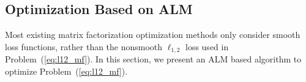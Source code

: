 \documentclass[letterpaper]{article}
\def\bE{{\bf E}}
\def\blambda{{\bm \lambda}}
\def\calC{{\mathcal{C}}}
\def\bL{{\bf L}}
\def\dsR{\mathds{R}}
\def\bX{{\bf X}}
\def\bX{{\bf X}}
\begin{document}
%
%
%
%
%
%
%
%
%
%
%
%
%




\subsection{Optimization Based on ALM}

Most existing matrix factorization optimization methods only consider smooth loss functions, rather than the nonsmooth $\ell_{1,2}$ loss used in Problem~(\ref{eq:l12_mf}).
In this section, we present an ALM based algorithm to optimize Problem~(\ref{eq:l12_mf}).
\end{document}
